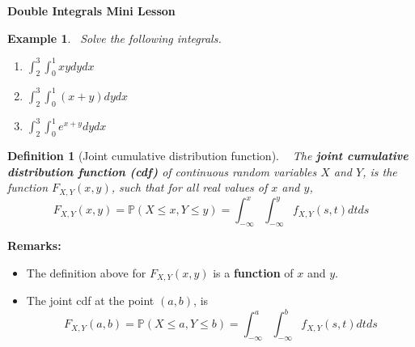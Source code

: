\documentclass[12pt]{amsart}
\newtheorem{definition}[theorem]{Definition}
\newtheorem{example}[theorem]{Example}
\newcommand\cdfXY{F_{X,Y}(x,y)}
\newcommand\intd{\displaystyle\int}
\begin{document}
{%
\newpage



\textbf{Double Integrals Mini Lesson}

\begin{example}\ Solve the following integrals.
\begin{enumerate}

\item $\intd_{2}^{3}\intd_{0}^{1} xy dydx$

\vfill

\item $\intd_{2}^{3}\intd_{0}^{1} (x+y) dydx$

\vfill

\item $\intd_{2}^{3}\intd_{0}^{1} e^{x+y} dydx$
\vfill

\end{enumerate}

\end{example}


\newpage

\begin{definition}[Joint cumulative distribution function]\ \newline
The \textbf{joint cumulative distribution function (cdf)} of continuous random variables $X$ and $Y$, is the function $\cdfXY$, such that for all real values of $x$ and $y$,
$$
\cdfXY = \mathbb{P}(X \leq x, Y \leq y) = \int_{-\infty}^x\int_{-\infty}^y f_{X,Y}(s,t)dtds
$$
\end{definition}

\textbf{Remarks:} \newline

\begin{itemize}
\item The definition above for $\cdfXY$ is a \textbf{function} of $x$ and $y$.
\item  The joint cdf at the point $(a,b)$, is 
$$
F_{X,Y}(a,b) = \mathbb{P}(X \leq a, Y \leq b) = \int_{-\infty}^a\int_{-\infty}^b f_{X,Y}(s,t)dtds
$$
\end{itemize}

}
\end{document}
